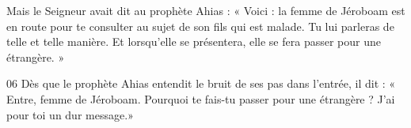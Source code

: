Mais le Seigneur avait dit au prophète Ahias : « Voici : la femme de Jéroboam est en route pour te consulter au sujet de son fils qui est malade. Tu lui parleras de telle et telle manière. Et lorsqu’elle se présentera, elle se fera passer pour une étrangère. »

06 Dès que le prophète Ahias entendit le bruit de ses pas dans l’entrée, il dit : « Entre, femme de Jéroboam. Pourquoi te fais-tu passer pour une étrangère ? J’ai pour toi un dur message.»

